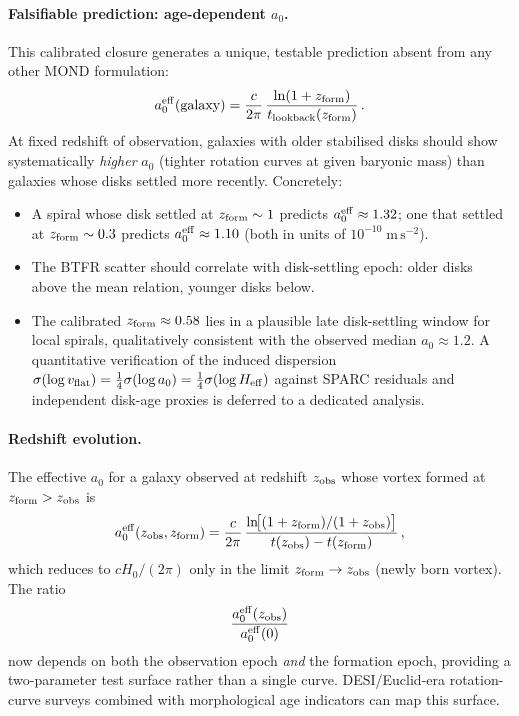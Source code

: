 \documentclass[11pt]{article}
\begin{document}
\paragraph{Falsifiable prediction: age-dependent $a_0$.}
This calibrated closure generates a unique, testable prediction absent from any other MOND formulation:
\begin{equation}\label{eq:a0_age}
a_0^{\rm eff}(\text{galaxy})
= \frac{c}{2\pi}\,\frac{\ln(1+z_{\rm form})}{t_{\rm lookback}(z_{\rm form})}\,.
\end{equation}
At fixed redshift of observation, galaxies with older stabilised disks should show systematically \emph{higher} $a_0$ (tighter rotation curves at given baryonic mass) than galaxies whose disks settled more recently.  Concretely:
\begin{itemize}
\item A spiral whose disk settled at $z_{\rm form}\sim 1$ predicts $a_0^{\rm eff}\approx 1.32$;
  one that settled at $z_{\rm form}\sim 0.3$ predicts $a_0^{\rm eff}\approx 1.10$
  (both in units of $10^{-10}\;\mathrm{m\,s^{-2}}$).
\item The BTFR scatter should correlate with disk-settling epoch: older disks above the mean relation, younger disks below.
\item The calibrated $z_{\rm form}\approx0.58$ lies in a plausible late disk-settling window for local spirals, qualitatively consistent with the observed median $a_0\approx 1.2$.  A quantitative verification of the induced dispersion $\sigma(\log v_{\rm flat})=\tfrac14\sigma(\log a_0)=\tfrac14\sigma(\log H_{\rm eff})$ against SPARC residuals and independent disk-age proxies is deferred to a dedicated analysis.
\end{itemize}

\paragraph{Redshift evolution.}
The effective $a_0$ for a galaxy observed at redshift $z_{\rm obs}$ whose vortex formed at $z_{\rm form}>z_{\rm obs}$ is
\begin{equation}\label{eq:a0z}
a_0^{\rm eff}(z_{\rm obs},z_{\rm form})
= \frac{c}{2\pi}\,
  \frac{\ln\!\bigl[(1+z_{\rm form})/(1+z_{\rm obs})\bigr]}
       {t(z_{\rm obs})-t(z_{\rm form})}\,,
\end{equation}
which reduces to $cH_0/(2\pi)$ only in the limit $z_{\rm form}\to z_{\rm obs}$ (newly born vortex).  The ratio
\begin{equation}\label{eq:a0_ratio}
\frac{a_0^{\rm eff}(z_{\rm obs})}{a_0^{\rm eff}(0)}
\end{equation}
now depends on both the observation epoch \emph{and} the formation epoch, providing a two-parameter test surface rather than a single curve.  DESI/Euclid-era rotation-curve surveys combined with morphological age indicators can map this surface.
\end{document}
